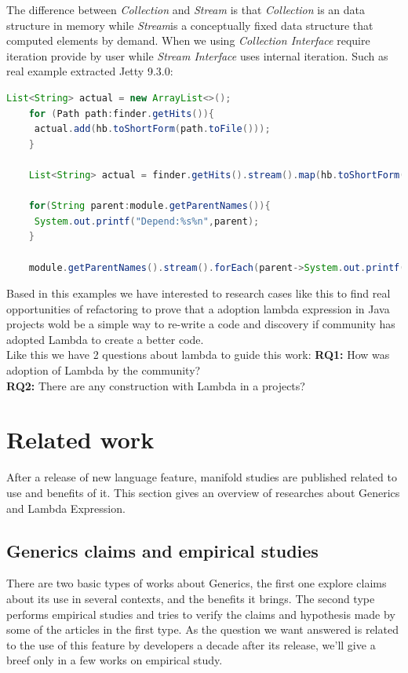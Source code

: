 \documentclass{sig-alternate-05-2015}
\begin{document}
	The difference between \textit{Collection} and \textit{Stream} is that \textit{Collection} is an data structure in memory while \textit{Stream}is a conceptually fixed data structure that computed elements by demand. When we using \textit{Collection Interface} require iteration provide by user while \textit{Stream Interface} uses internal iteration. Such as real example extracted Jetty 9.3.0:\\

	\begin{lstlisting}[language=java]
	List<String> actual = new ArrayList<>(); 
	for (Path path:finder.getHits()){
	 actual.add(hb.toShortForm(path.toFile()));
	}
	
	List<String> actual = finder.getHits().stream().map(hb.toShortForm(Path::toFile)).collect(toList());
	
	for(String parent:module.getParentNames()){
	 System.out.printf("Depend:%s%n",parent);
	}
	
	module.getParentNames().stream().forEach(parent->System.out.printf("Depend:%s%n",parent));
\end{lstlisting}

Based in this examples we have interested to research cases like this to find real opportunities of refactoring to prove that a adoption lambda expression in Java projects wold be a simple way to re-write a code and discovery if community has adopted Lambda to create a better code.\\
Like this we have 2 questions about lambda to guide this work:
\textbf{RQ1:} How was adoption of Lambda by the community?\\
\textbf{RQ2:} There are any construction with Lambda in a projects?\\


\section{Related work}
After a release of new language feature, manifold studies are published related to use and benefits of it. This section gives an overview of researches about Generics and Lambda Expression.

\subsection{Generics claims and empirical studies}

There are two basic types of works about Generics, the first one explore claims about its use in several contexts, and the benefits it brings. The second type performs empirical studies and tries to verify the claims and hypothesis made by some of the articles in the first type.
As the question we want answered is related to the use of this feature by developers a decade after its release, we'll give a breef only in a few works on empirical study.
\end{document}
